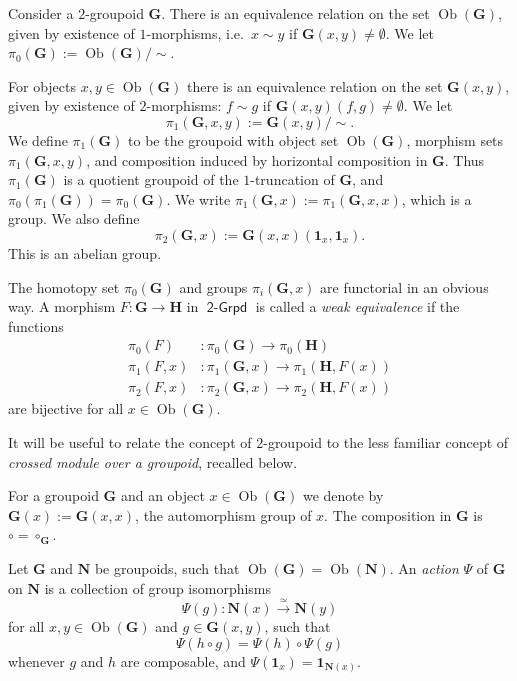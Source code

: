 \documentclass[a4paper,10pt]{amsart}
\theoremstyle{definition}
\numberwithin{equation}{section}
\newcommand{\iso}{\xrightarrow{\simeq}}
\newcommand{\opn}{\operatorname}
\newcommand{\cat}[1]{\operatorname{\mathsf{#1}}}
\newcommand{\bsym}[1]{\boldsymbol{#1}}
\newcommand{\lb}{\linebreak}
\begin{document}
Consider a $2$-groupoid $\bsym{G}$. There is an equivalence relation on the set 
$\opn{Ob}(\bsym{G})$, given by existence of $1$-morphisms, i.e.\ $x \sim y$ if 
$\bsym{G}(x, y) \neq \emptyset$. We let 
$\pi_0(\bsym{G}) := \opn{Ob}(\bsym{G}) / {\sim}$. 

For objects $x, y \in \opn{Ob}(\bsym{G})$ there is an equivalence relation on
the set $\bsym{G}(x, y)$, given by existence of $2$-morphisms:
$f \sim g$ if $\bsym{G}(x, y)(f, g) \neq \emptyset$. We let 
\[ \pi_1(\bsym{G}, x, y) := \bsym{G}(x, y) / {\sim} . \]
We define $\pi_1(\bsym{G})$ to be the  groupoid with object set
$\opn{Ob}(\bsym{G})$, \lb
morphism sets $\pi_1(\bsym{G}, x, y)$, and composition induced by horizontal
composition in $\bsym{G}$. Thus $\pi_1(\bsym{G})$ is a quotient groupoid of the
$1$-truncation of $\bsym{G}$, and \lb
$\pi_0(\pi_1(\bsym{G})) = \pi_0(\bsym{G})$.
We write $\pi_1(\bsym{G}, x) := \pi_1(\bsym{G}, x, x)$, which is a group.
We also define 
\[ \pi_2(\bsym{G}, x)  := \bsym{G}(x, x)(\bsym{1}_x, \bsym{1}_x) . \]
This is an abelian group. 

The homotopy set $\pi_0(\bsym{G})$ and groups $\pi_i(\bsym{G}, x)$ are
functorial in an obvious way. 
A morphism $F : \bsym{G} \to \bsym{H}$ in 
$\cat{2-Grpd}$ is called a {\em weak equivalence} if the functions 
\[ \begin{aligned}
\pi_0(F) & : \pi_0(\bsym{G}) \to \pi_0(\bsym{H})
\\
\pi_1(F, x) & : \pi_1(\bsym{G}, x) \to \pi_1(\bsym{H}, F(x))
\\
\pi_2(F, x) & : \pi_2(\bsym{G}, x) \to \pi_2(\bsym{H}, F(x))
\end{aligned} \]
are bijective for all $x \in \opn{Ob}(\bsym{G})$. 

It will be useful to relate the concept of $2$-groupoid to the less
familiar concept of {\em crossed module over a groupoid}, recalled below.

For a groupoid $\bsym{G}$ and an object $x \in \opn{Ob}(\bsym{G})$
we denote by $\bsym{G}(x) := \bsym{G}(x, x)$, the automorphism group of $x$. 
The composition in $\bsym{G}$ is $\circ = \circ_{\bsym{G}}$.

Let $\bsym{G}$ and $\bsym{N}$ be groupoids, such that 
$\opn{Ob}(\bsym{G}) = \opn{Ob}(\bsym{N})$. An {\em action} $\Psi$ of $\bsym{G}$
on 
$\bsym{N}$ is a collection of group isomorphisms 
\[ \Psi(g) : \bsym{N}(x) \iso \bsym{N}(y) \]
for all $x, y \in \opn{Ob}(\bsym{G})$ and $g \in \bsym{G}(x, y)$, 
such that 
\[ \Psi(h \circ g) = \Psi(h) \circ \Psi(g) \]
whenever $g$ and $h$ are composable, and 
$\Psi(\bsym{1}_x) = \bsym{1}_{\bsym{N}(x)}$.
\end{document}
